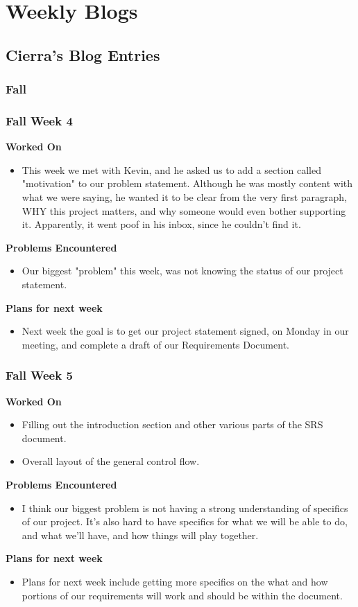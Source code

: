 \documentclass[compsoc,draftclsnofoot,onecolumn,10pt]{IEEEtran}
\begin{document}
\clearpage
\section{Weekly Blogs}

\subsection{Cierra's Blog Entries}
    
\subsubsection{Fall}
\subsubsection*{Fall Week 4}
\textbf{Worked On}
\begin{itemize}
    \item This week we met with Kevin, and he asked us to add a section called "motivation" to our problem statement. Although he was mostly content with what we were saying, he wanted it to be clear from the very first paragraph, WHY this project matters, and why someone would even bother supporting it. Apparently, it went poof in his inbox, since he couldn't find it.
\end{itemize}
\textbf{Problems Encountered}
\begin{itemize}
    \item Our biggest "problem" this week, was not knowing the status of our project statement.
\end{itemize}
\textbf{Plans for next week}
\begin{itemize}
    \item Next week the goal is to get our project statement signed, on Monday in our meeting, and complete a draft of our Requirements Document.
\end{itemize}


\subsubsection*{Fall Week 5}
\textbf{Worked On}
\begin{itemize}
    \item Filling out the introduction section and other various parts of the SRS document.
    \item Overall layout of the general control flow.
\end{itemize}
\textbf{Problems Encountered}
\begin{itemize}
    \item I think our biggest problem is not having a strong understanding of specifics of our project. It's also hard to have specifics for what we will be able to do, and what we'll have, and how things will play together.
\end{itemize}
\textbf{Plans for next week}
\begin{itemize}
    \item Plans for next week include getting more specifics on the what and how portions of our requirements will work and should be within the document.
\end{itemize}
\end{document}
